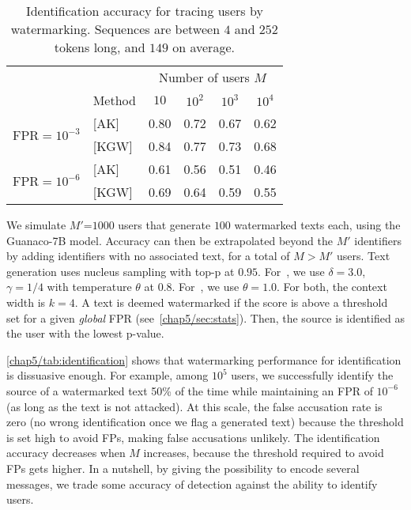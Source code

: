 \begin{table}[t]
    \caption{Identification accuracy for tracing users by watermarking. 
    Sequences are between $4$ and $252$ tokens long, and $149$ on average.
    }
    \label{chap5/tab:identification}
    \centering
    \footnotesize
    \begin{tabular}{cl cccc}
        \toprule
        & & \multicolumn{4}{c}{Number of users $M$} \\
        \cmidrule{3-6}
        & Method & $10$ & $10^2$ & $10^3$ & $10^4$ \\ \midrule
        \multirow{2}{*}{FPR$=10^{-3}$} & [AK] \citep{aaronson2023watermarking}      & 0.80 & 0.72 & 0.67 & 0.62 \\
        & [KGW] \citep{kirchenbauer2023watermark}  & 0.84 & 0.77 & 0.73 & 0.68 \\ \midrule
        \multirow{2}{*}{FPR$=10^{-6}$} & [AK] \citep{aaronson2023watermarking}	      & 0.61 & 0.56 & 0.51 & 0.46 \\
        & [KGW] \citep{kirchenbauer2023watermark} 	                              & 0.69 & 0.64 & 0.59 & 0.55 \\
        \bottomrule
    \end{tabular}
\end{table}


We simulate $M'$=$1000$ users that generate $100$ watermarked texts each, using the Guanaco-7B model. 
Accuracy can then be extrapolated beyond the $M'$ identifiers by adding identifiers with no associated text, for a total of $M>M'$ users.
Text generation uses nucleus sampling with top-p at $0.95$.
For~\citep{kirchenbauer2023watermark}, we use $\delta=3.0$, $\gamma=1/4$ with temperature $\theta$ at $0.8$.
For~\citep{aaronson2023watermarking}, we use $\theta = 1.0$.
For both, the context width is $k=4$.
A text is deemed watermarked if the score is above a threshold set for a given \emph{global} FPR (see~\ref{chap5/sec:stats}).
Then, the source is identified as the user with the lowest p-value.

\autoref{chap5/tab:identification} shows that watermarking performance for identification is dissuasive enough. 
For example, among $10^5$ users, we successfully identify the source of a watermarked text 50\% of the time while maintaining an FPR of $10^{-6}$ (as long as the text is not attacked).
At this scale, the false accusation rate is zero (no wrong identification once we flag a generated text) because the threshold is set high to avoid FPs, making false accusations unlikely. 
The identification accuracy decreases when $M$ increases, because the threshold required to avoid FPs gets higher.
In a nutshell, by giving the possibility to encode several messages, we trade some accuracy of detection against the ability to identify users.
